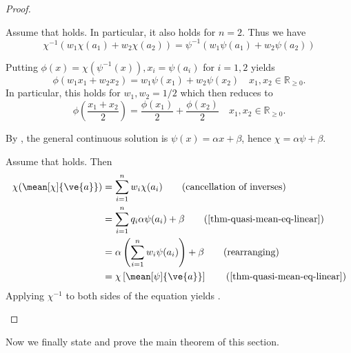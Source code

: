 \begin{proof}

  \begin{proofpart}[$\Rightarrow$]
    Assume that  holds. In particular, it also holds for $n=2$.
    Thus we have
    \begin{equation*}
      \chi^{-1}(w_1 \chi(a_1) + w_2 \chi(a_2)) = \psi^{-1} (w_1 \psi(a_1) + w_2 \psi (a_2))
    \end{equation*}

    Putting $\phi(x) = \chi ( \psi^{-1} (x)), x_i = \psi (a_i)$ for $i=1, 2$ yields
    \begin{equation*}
      \phi(w_1 x_1 + w_2 x_2) = w_1 \psi(x_1) + w_2 \psi(x_2) \quad x_1, x_2 \in \mathbb{R}_{\geq  0}.
    \end{equation*}
    In particular, this holds for $w_1, w_2 = 1/2$ which then reduces to
    \begin{equation*}
      \phi \left (\frac{x_1 + x_2}{2}\right ) = \frac{\phi(x_1)}{2} + \frac{\phi (x_2)}{2} \quad x_1, x_2 \in \mathbb{R}_{\geq  0}.
    \end{equation*}

    By \parencite[p. 46]{aczel1966lectures}, the general continuous solution is $\psi(x) = \alpha x + \beta$, hence $\chi = \alpha \psi + \beta$.
  \end{proofpart}

  \begin{proofpart}[$\Leftarrow$]
    Assume that  holds.
    Then
    \begin{align*}
      \chi ( \mean[\chi]{\ve{a}}) &= \sum_{i=1}^{n} w_i \chi(a_i) \tag{cancellation of inverses} \\
                                  &= \sum_{i=1}^{n} q_i \alpha \psi(a_i) + \beta \tag{\cref{thm-quasi-mean-eq-linear}} \\
                                  &= \alpha \left ( \sum_{i=1}^{n} w_i \psi(a_i) \right ) + \beta \tag{rearranging} \\
                                  &= \chi \left [ \mean[\psi]{\ve{a}} \right] \tag{\cref{thm-quasi-mean-eq-linear}}
    \end{align*}
    Applying $\chi^{-1}$ to both sides of the equation yields .
  \end{proofpart}
\end{proof}

Now we finally state and prove the main theorem of this section.

